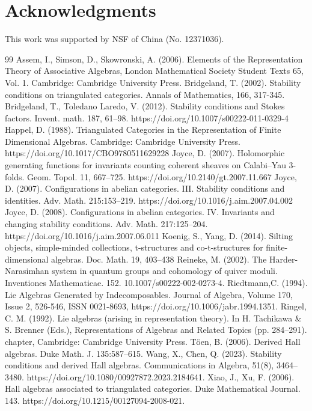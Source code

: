 \documentclass[a4paper,12pt]{amsart}
\begin{document}
\section*{Acknowledgments}
This work was supported by NSF of China (No. 12371036).
\begin{thebibliography}{99}
Assem, I., Simson, D., Skowronski, A. (2006). Elements of the Representation Theory of Associative Algebras, London
Mathematical Society Student Texts 65, Vol. 1. Cambridge: Cambridge University Press.
Bridgeland, T. (2002). Stability conditions on triangulated categories. Annals of Mathematics, 166, 317-345.
Bridgeland, T., Toledano Laredo, V.  (2012). Stability conditions and Stokes factors. Invent. math. 187, 61–98. https://doi.org/10.1007/s00222-011-0329-4
Happel, D. (1988). Triangulated Categories in the Representation of Finite Dimensional Algebras. Cambridge: Cambridge University Press. https://doi.org/10.1017/CBO9780511629228
Joyce, D. (2007). Holomorphic generating functions for invariants counting coherent sheaves on
Calabi–Yau 3-folds. Geom. Topol. 11, 667–725. https://doi.org/10.2140/gt.2007.11.667
Joyce, D. (2007). Configurations in abelian categories. III. Stability conditions and identities. Adv. Math. 215:153–219. https://doi.org/10.1016/j.aim.2007.04.002
Joyce, D. (2008). Configurations in abelian categories. IV. Invariants and changing stability conditions. Adv. Math.
217:125–204. https://doi.org/10.1016/j.aim.2007.06.011
Koenig, S., Yang, D. (2014). Silting objects, simple-minded collections, t-structures and co-t-structures for finite-dimensional algebras. Doc. Math. 19, 403–438
Reineke, M. (2002). The Harder-Narasimhan system in quantum groups and cohomology of quiver moduli. Inventiones Mathematicae. 152. 10.1007/s00222-002-0273-4. 
Riedtmann,C. (1994). Lie Algebras Generated by Indecomposables. Journal of Algebra, Volume 170, Issue 2, 526-546, ISSN 0021-8693, https://doi.org/10.1006/jabr.1994.1351.
Ringel, C. M. (1992). Lie algebras (arising in representation theory). In H. Tachikawa \& S. Brenner (Eds.), Representations of Algebras and Related Topics (pp. 284–291). chapter, Cambridge: Cambridge University Press.
T\"{o}en, B. (2006). Derived Hall algebras. Duke Math. J. 135:587–615.
Wang, X.,  Chen, Q. (2023). Stability conditions and derived Hall algebras. Communications in Algebra, 51(8), 3464–3480. https://doi.org/10.1080/00927872.2023.2184641.
Xiao, J., Xu, F. (2006). Hall algebras associated to triangulated categories. Duke Mathematical Journal. 143. https://doi.org/10.1215/00127094-2008-021. 
\end{thebibliography}
\end{document}
